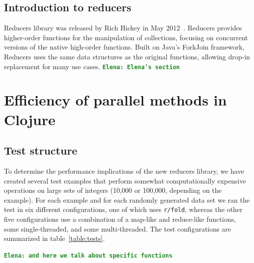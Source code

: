 \documentclass[12pt]{article}
\newcommand{\comment}[1]{{\bf \tt  {#1}}}
\newcommand{\emcomment}[1]{\textcolor{ForestGreen}{\comment{Elena: {#1}}}}
\newcommand{\joecomment}[1]{\textcolor{JoesGold}{\comment{Joe: {#1}}}}
\newcommand{\clocode}[1]{{\texttt {#1}}}
\begin{document}
\subsection{Introduction to reducers}\label{sec:reducers}
Reducers library was released by Rich Hickey in May 2012~\cite{HickeyReducers}. Reducers provides higher-order functions for the manipulation of collections, focusing on concurrent versions of the native high-order functions.  Built on Java's ForkJoin framework, Reducers uses the same data structures as the original functions, allowing drop-in replacement for many use cases.
\emcomment{Elena's section}

\section{Efficiency of parallel methods in Clojure}\label{sec:efficiency} 

\subsection{Test structure}\label{sec:testStruct}
To determine the performance implications of the new reducers library, we have created several test examples that perform somewhat computationally expensive operations on large sets of integers (10,000 or 100,000, depending on the example). For each example and for each randomly generated data set we ran the test in six different configurations, one of which uses \clocode{r/fold}, whereas the other five configurations use a combination of a map-like and reduce-like functions, some single-threaded, and some multi-threaded. 
The test configurations are summarized in table~\ref{table:tests}.

\emcomment{and here we talk about specific functions}

\end{document}
